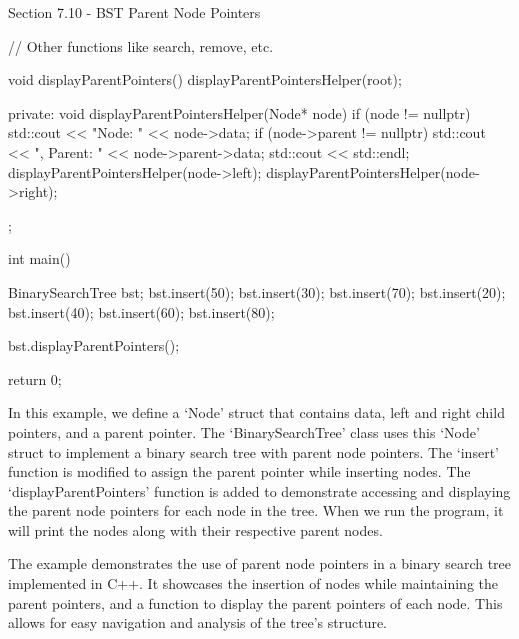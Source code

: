 \begin{notes}{Section 7.10 - BST Parent Node Pointers}
\begin{highlight}
\begin{code}[C++]
{        // Other functions like search, remove, etc.
    
        void displayParentPointers() {
            displayParentPointersHelper(root);
        }
    
    private:
        void displayParentPointersHelper(Node* node) {
            if (node != nullptr) {
                std::cout << "Node: " << node->data;
                if (node->parent != nullptr) {
                    std::cout << ", Parent: " << node->parent->data;
                }
                std::cout << std::endl;
                displayParentPointersHelper(node->left);
                displayParentPointersHelper(node->right);
            }
        }
    };
    
    int main() {
        BinarySearchTree bst;
        bst.insert(50);
        bst.insert(30);
        bst.insert(70);
        bst.insert(20);
        bst.insert(40);
        bst.insert(60);
        bst.insert(80);
    
        bst.displayParentPointers();
    
        return 0;
    }
    \end{code}
        In this example, we define a `Node' struct that contains data, left and right child pointers, and a parent pointer. The `BinarySearchTree' class uses this `Node' struct to implement a binary search tree with parent node pointers. The `insert' function is modified to assign the parent pointer while inserting nodes. The `displayParentPointers' 
        function is added to demonstrate accessing and displaying the parent node pointers for each node in the tree. When we run the program, it will print the nodes along with their respective parent nodes.
    
        The example demonstrates the use of parent node pointers in a binary search tree implemented in C++. It showcases the insertion of nodes while maintaining the parent pointers, and a function to display the parent pointers of each node. This allows for easy navigation and analysis of the tree's structure.
    \end{highlight}
\end{notes}

